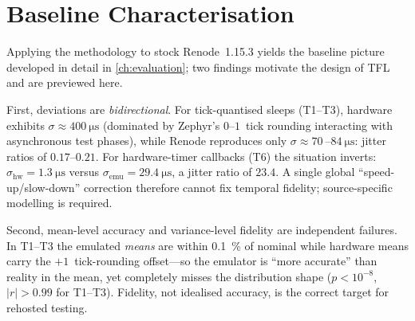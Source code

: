 \section{Baseline Characterisation}
\label{sec:problem:baseline}

Applying the methodology to stock Renode~1.15.3 yields the baseline
picture developed in detail in \cref{ch:evaluation}; two findings
motivate the design of TFL and are previewed here.

First, deviations are \emph{bidirectional}. For tick-quantised sleeps
(T1--T3), hardware exhibits $\sigma \approx \SI{400}{\micro\second}$
(dominated by Zephyr's $0$--$1$\,\ms{} tick rounding interacting with
asynchronous test phases), while Renode reproduces only
$\sigma \approx \SI{70}{}$--$\SI{84}{\micro\second}$: jitter ratios of
$0.17$--$0.21$. For hardware-timer callbacks (T6) the situation
inverts: $\sigma_{\mathrm{hw}} = \SI{1.3}{\micro\second}$ versus
$\sigma_{\mathrm{emu}} = \SI{29.4}{\micro\second}$, a jitter ratio of
$23.4$. A single global ``speed-up/slow-down'' correction therefore
cannot fix temporal fidelity; source-specific modelling is required.

Second, mean-level accuracy and variance-level fidelity are
independent failures. In T1--T3 the emulated \emph{means} are within
\SI{0.1}{\percent} of nominal while hardware means carry the
$+1$\,\ms{} tick-rounding offset---so the emulator is ``more accurate''
than reality in the mean, yet completely misses the distribution shape
($p < 10^{-8}$, $|r| > 0.99$ for T1--T3). Fidelity, not idealised
accuracy, is the correct target for rehosted testing.
